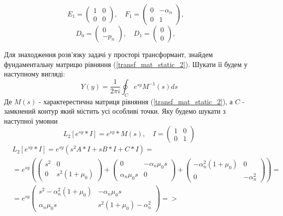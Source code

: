 \begin{equation*}
    E_1 = \begin{pmatrix}
        1 & 0 \\
        0 & 0
    \end{pmatrix}, \quad
    F_1 = \begin{pmatrix}
        0 & -\alpha_n \\
        0 & 1
    \end{pmatrix}, \quad
\end{equation*}
\begin{equation*}
    D_0 = \begin{pmatrix}
        0 \\
        -p_n
    \end{pmatrix}, \quad
    D_1 = \begin{pmatrix}
        0 \\
        0
    \end{pmatrix}, \quad
\end{equation*}

Для знаходження розв'язку задачі у просторі трансформант, знайдем фундаментальну матрицю рівняння (\ref{transf_mat_static_2}).
Шукати її будем у наступному вигляді:
\begin{equation}
    Y(y) = \frac{1}{2\pi i} \oint_C e^{sy} M^{-1}(s)ds
\end{equation}
Де $M(s)$ - характерестична матриця рівняння (\ref{transf_mat_static_2}), а $C$ - замкнений контур який містить усі особливі точки. Яку будемо шукати з наступної умовни
\begin{equation}
    L_2\left[ e^{sy}*I \right] = e^{sy} * M(s), \quad I = \begin{pmatrix} 1 & 0 \\ 0 & 1 \end{pmatrix}
\end{equation}
\begin{align*}
    &L_2\left[ e^{sy}*I \right] = e^{sy} \left( s^2A * I + s B*I + C*I \right) = \\
    &=e^{sy} \left( \begin{pmatrix}
        s^2 & 0 \\
        0 & s^2 (1 + \mu_0)
    \end{pmatrix} + \begin{pmatrix}
        0 & -\alpha_n \mu_0 s\\
        \alpha_n \mu_0 s & 0
    \end{pmatrix} + \begin{pmatrix}
        -\alpha_n^2(1 + \mu_0) & 0 \\
        0 & -\alpha_n^2
    \end{pmatrix} \right) =  \\
    &=e^{sy} \begin{pmatrix}
        s^2 -\alpha_n^2(1 + \mu_0) & -\alpha_n \mu_0 s \\
        \alpha_n \mu_0 s & s^2 (1 + \mu_0) -\alpha_n^2
     \end{pmatrix} =>
\end{align*}

